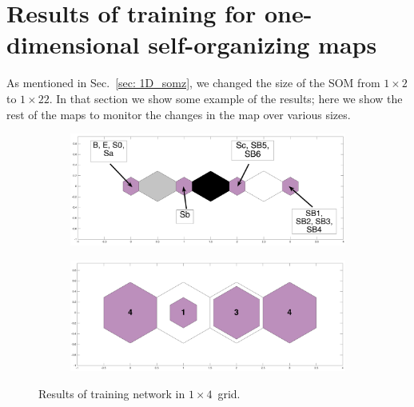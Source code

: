 \newpage
\appendix
\section{Results of training for one-dimensional self-organizing maps}
\label{app: high_Z_1d_soms}
As mentioned in Sec.~\ref{sec: 1D_somz}, we changed the size of the SOM from $1\times2$ to $1\times22$. In that section we show some example of the results; here we show the rest of the maps to monitor the changes in the map over various sizes.

\label{app: 1d}
    \begin{figure}
        \begin{subfigure}[b]{0.5\textwidth}
            \centering
            \includegraphics[width=\textwidth]{../images0.01/1d/apps/dist_1_by_4.png}
        \end{subfigure}
        \hfill
        \begin{subfigure}[b]{0.5\textwidth}
             \includegraphics[width=\textwidth]{../images0.01/1d/apps/hit_t_1_by_4.png}
        \end{subfigure}
                \caption{Results of training network in $1\times4$~grid.}
         \label{fig: 1by4T}
    \end{figure}
    
